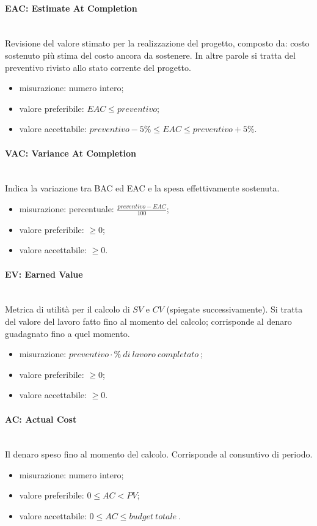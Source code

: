 			\paragraph*{EAC: Estimate At Completion}\mbox{}\\
			Revisione del valore stimato per la realizzazione del progetto, composto da: costo sostenuto più stima del costo ancora da sostenere. In altre parole si tratta del preventivo rivisto allo stato corrente del progetto.
			\begin{itemize}
				\item  misurazione: numero intero;
				\item  valore preferibile: $ EAC \leq preventivo$;
				\item  valore accettabile: $ preventivo -5\% \leq EAC \leq preventivo + 5\%$. 
			\end{itemize}
			
			\paragraph*{VAC: Variance At Completion}\mbox{}\\
			Indica la variazione tra BAC ed EAC e la spesa effettivamente sostenuta.
			\begin{itemize}
				\item  misurazione: percentuale: $\frac{preventivo - EAC}{100}$;
				\item  valore preferibile: $\geq 0$;
				\item  valore accettabile: $\geq 0$.
			\end{itemize}
		
			\paragraph*{EV: Earned Value}\mbox{}\\
			Metrica di utilità per il calcolo di $SV$ e $CV$ (spiegate successivamente). Si tratta del valore del lavoro fatto fino al momento del calcolo; corrisponde al denaro guadagnato fino a quel momento.
			\begin{itemize}
				\item  misurazione: $preventivo \cdot \%\ di\ lavoro\ completato\ $;
				\item  valore preferibile: $ \geq 0$;
				\item  valore accettabile: $ \geq 0$.
			\end{itemize}
		
			\paragraph*{AC: Actual Cost}\mbox{}\\
			Il denaro speso fino al momento del calcolo. Corrisponde al consuntivo di periodo.
			\begin{itemize}
				\item  misurazione: numero intero;
				\item  valore preferibile: $0 \leq AC < PV$;
				\item  valore accettabile: $0 \leq AC \leq budget\ totale\ $.
			\end{itemize}
		
